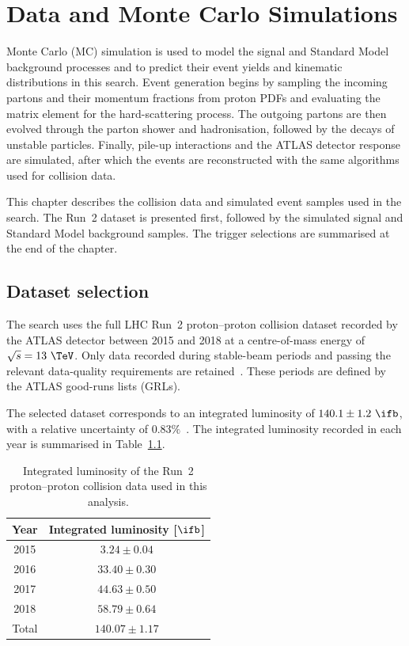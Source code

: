 \chapter{Data and Monte Carlo Simulations}
\label{chapter:MC_simulation}

Monte Carlo (MC) simulation is used to model the signal and Standard Model background processes and to predict their event yields and kinematic distributions in this search.
Event generation begins by sampling the incoming partons and their momentum fractions from proton PDFs and evaluating the matrix element for the hard-scattering process.
The outgoing partons are then evolved through the parton shower and hadronisation, followed by the decays of unstable particles.
Finally, pile-up interactions and the ATLAS detector response are simulated, after which the events are reconstructed with the same algorithms used for collision data.

This chapter describes the collision data and simulated event samples used in the search.
The Run~2 dataset is presented first, followed by the simulated signal and Standard Model background samples.
The trigger selections are summarised at the end of the chapter.


\section{Dataset selection}
\label{sec:dataset_selection}

The search uses the full LHC Run~2 proton--proton collision dataset recorded by the ATLAS detector between 2015 and 2018 at a centre-of-mass energy of $\sqrt{s}=13~\TeV$.
Only data recorded during stable-beam periods and passing the relevant data-quality requirements are retained~\cite{ATLASDataQualityRun2}.
These periods are defined by the ATLAS good-runs lists (GRLs).

The selected dataset corresponds to an integrated luminosity of $140.1\pm1.2~\ifb$, with a relative uncertainty of $0.83\%$~\cite{ATLASLumiRun2}.
The integrated luminosity recorded in each year is summarised in Table~\ref{tab:run2_luminosity}.

\begin{table}[htbp]
    \centering
    \caption{Integrated luminosity of the Run~2 proton--proton collision data used in this analysis.}
    \label{tab:run2_luminosity}
    \begin{tabular}{cc}
        \hline
        Year & Integrated luminosity [$\ifb$] \\
        \hline
        2015 & $3.24\pm0.04$ \\
        2016 & $33.40\pm0.30$ \\
        2017 & $44.63\pm0.50$ \\
        2018 & $58.79\pm0.64$ \\
        \hline
        Total & $140.07\pm1.17$ \\
        \hline
    \end{tabular}
\end{table}

